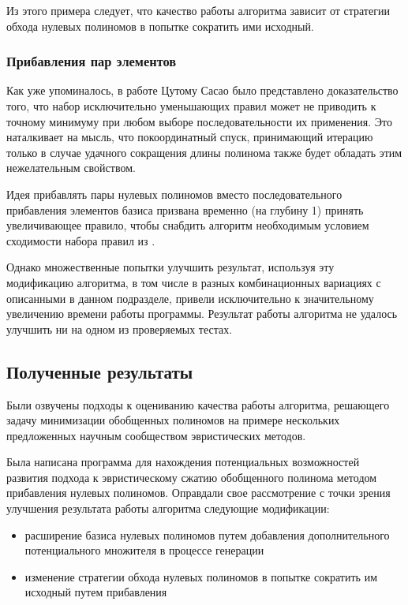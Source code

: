 \documentclass[a4paper,12pt,titlepage,finall]{article}
\begin{document}
Из этого примера следует, что качество работы алгоритма зависит от стратегии обхода нулевых полиномов в попытке сократить ими исходный.

\subsubsection{Прибавления пар элементов}

Как уже упоминалось, в работе Цутому Сасао \cite{convergence} было представлено доказательство того, что набор исключительно уменьшающих правил может не приводить к точному минимуму при любом выборе последовательности их применения. Это наталкивает на мысль, что покоординатный спуск, принимающий итерацию только в случае удачного сокращения длины полинома также будет обладать этим нежелательным свойством.

Идея прибавлять пары нулевых полиномов вместо последовательного прибавления элементов базиса призвана временно (на глубину 1) принять увеличивающее правило, чтобы снабдить алгоритм необходимым условием сходимости набора правил из \cite{convergence}.

Однако множественные попытки улучшить результат, используя эту модификацию алгоритма, в том числе в разных комбинационных вариациях с описанными в данном подразделе, привели исключительно к значительному увеличению времени работы программы. Результат работы алгоритма не удалось улучшить ни на одном из проверяемых тестах.

\subsection{Полученные результаты}

Были озвучены подходы к оцениванию качества работы алгоритма, решающего задачу минимизации обобщенных полиномов на примере нескольких предложенных научным сообществом эвристических методов.

Была написана программа для нахождения потенциальных возможностей развития подхода к эвристическому сжатию обобщенного полинома методом прибавления нулевых полиномов. Оправдали свое рассмотрение с точки зрения улучшения результата работы алгоритма следующие модификации:
\begin{itemize}
    \item расширение базиса нулевых полиномов путем добавления дополнительного потенциального множителя в процессе генерации
    \item изменение стратегии обхода нулевых полиномов в попытке сократить им исходный путем прибавления
\end{itemize}
\end{document}
